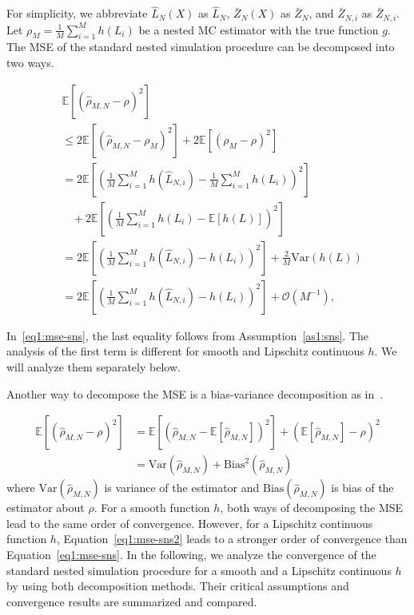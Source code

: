For simplicity, we abbreviate $\hat{L}_N(X)$ as $\hat{L}_N$, $\bar{Z}_N(X)$ as $\bar{Z}_N$, and $\bar{Z}_{N, i}$ as $\bar{Z}_{N, i}$.
Let $\rho_M = \frac{1}{M} \sum_{i=1}^M h(L_i)$ be a nested MC estimator with the true function $g$.
The MSE of the standard nested simulation procedure can be decomposed into two ways.

\begin{align} \label{eq1:mse-sns}
    & \mathbb{E} \left[ \left( \hat{\rho}_{M, N} - \rho \right)^2 \right] \nonumber \\
    & \leq 2 \mathbb{E} \left[ \left( \hat{\rho}_{M, N} - \rho_M \right)^2 \right] 
            + 2  \mathbb{E} \left[ \left(\rho_M - \rho \right)^2 \right]  \nonumber \\
    & = 2 \mathbb{E} \left[  \left( \frac{1}{M} \sum_{i=1}^M h\left( \hat{L}_{N, i} \right) -  \frac{1}{M} \sum_{i=1}^M h\left(L_i \right)  \right)^2\right] \nonumber \\
    & ~~~~ + 2  \mathbb{E} \left[ \left(\frac{1}{M} \sum_{i=1}^M h\left(L_i \right) - \mathbb{E}\left[ h(L)\right] \right)^2 \right]  \nonumber \\
    & = 2 \mathbb{E} \left[  \left( \frac{1}{M} \sum_{i=1}^M h\left( \hat{L}_{N, i} \right) -  h\left(L_i \right)  \right)^2\right] + \frac{2}{M} \text{Var}(h(L)) \nonumber \\
    & = 2 \mathbb{E} \left[  \left( \frac{1}{M} \sum_{i=1}^M h\left( \hat{L}_{N, i} \right) -  h\left(L_i \right)  \right)^2\right] + \mathcal{O}(M^{-1}),
\end{align}

In~\ref{eq1:mse-sns}, the last equality follows from Assumption~\ref{as1:sns}.
The analysis of the first term is different for smooth and Lipschitz continuous $h$. 
We will analyze them separately below.

Another way to decompose the MSE is a bias-variance decomposition as in~\cite{gordy2010nested}.

\begin{align} \label{eq1:mse-sns2}
    \mathbb{E} \left[ \left( \hat{\rho}_{M, N} - \rho \right)^2 \right] 
    & = \mathbb{E} \left[ \left( \hat{\rho}_{M, N} - \mathbb{E} \left[ \hat{\rho}_{M, N} \right] \right)^2 \right] + \left( \mathbb{E} \left[ \hat{\rho}_{M, N} \right] - \rho \right)^2 \nonumber \\
    & = \text{Var}(\hat{\rho}_{M, N}) + \text{Bias}^2(\hat{\rho}_{M, N})
\end{align}
where $\text{Var}(\hat{\rho}_{M, N})$ is variance of the estimator and $\text{Bias}(\hat{\rho}_{M, N})$ is bias of the estimator about $\rho$.
For a smooth function $h$, both ways of decomposing the MSE lead to the same order of convergence.
However, for a Lipschitz continuous function $h$, Equation~\ref{eq1:mse-sns2} leads to a stronger order of convergence than Equation~\ref{eq1:mse-sns}.
In the following, we analyze the convergence of the standard nested simulation procedure for a smooth and a Lipschitz continuous $h$ by using both decomposition methods.
Their critical assumptions and convergence results are summarized and compared.

